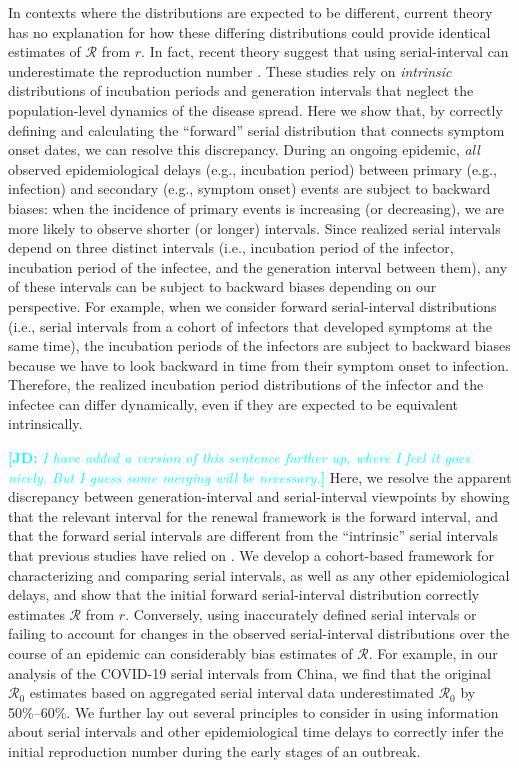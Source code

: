 \documentclass[12pt]{article}
\newcommand{\comment}{\showcomment}
\newcommand{\showcomment}[3]{\textcolor{#1}{\textbf{[#2: }\textsl{#3}\textbf{]}}}
\newcommand{\jd}[1]{\comment{cyan}{JD}{#1}}
\newcommand{\Rx}[1]{\ensuremath{{\mathcal R}_{#1}}\xspace}
\newcommand{\Ro}{\Rx{0}}
\newcommand{\RR}{\ensuremath{{\mathcal R}}\xspace}
\begin{document}
In contexts where the distributions are expected to be different, current theory has no explanation for how these differing distributions could provide identical estimates of \RR from $r$. 
In fact, recent theory suggest that using serial-interval can underestimate the reproduction number \citep{britton2019estimation, ganyani2020estimating}.
These studies rely on \emph{intrinsic} distributions of incubation periods and generation intervals that neglect the population-level dynamics of the disease spread.
Here we show that, by correctly defining and calculating the ``forward'' serial distribution that connects symptom onset dates, we can resolve this discrepancy.
During an ongoing epidemic, \emph{all} observed epidemiological delays (e.g., incubation period) between primary (e.g., infection) and secondary (e.g., symptom onset) events are subject to backward biases: when the incidence of primary events is increasing (or decreasing), we are more likely to observe shorter (or longer) intervals.
Since realized serial intervals depend on three distinct intervals (i.e., incubation period of the infector, incubation period of the infectee, and the generation interval between them), any of these intervals can be subject to backward biases depending on our perspective.
For example, when we consider forward serial-interval distributions (i.e., serial intervals from a cohort of infectors that developed symptoms at the same time), the incubation periods of the infectors are subject to backward biases because we have to look backward in time from their symptom onset to infection.
Therefore, the realized incubation period distributions of the infector and the infectee can differ dynamically, even if they are expected to be equivalent intrinsically.

\jd{I have added a version of this sentence further up, where I feel it goes nicely. But I guess some merging will be necessary.} Here, we resolve the apparent discrepancy between generation-interval and serial-interval viewpoints by showing that the relevant interval for the renewal framework is the forward interval, and that the forward serial intervals are different from the ``intrinsic'' serial intervals that previous studies have relied on \citep{svensson2007note,klinkenberg2011correlation,te2013estimating,champredon2018equivalence, britton2019estimation}.
We develop a cohort-based framework for characterizing and comparing serial intervals, as well as any other epidemiological delays, and show that the initial forward serial-interval distribution correctly estimates \RR from $r$.
Conversely, using inaccurately defined serial intervals or failing to account for changes in the observed serial-interval distributions over the course of an epidemic can considerably bias estimates of \RR.
For example, in our analysis of the COVID-19 serial intervals from China, we find that the original \Ro estimates based on aggregated serial interval data underestimated \Ro by 50\%--60\%.
We further lay out several principles to consider in using information about serial intervals and other epidemiological time delays to correctly infer the initial reproduction number during the early stages of an outbreak.
\end{document}
